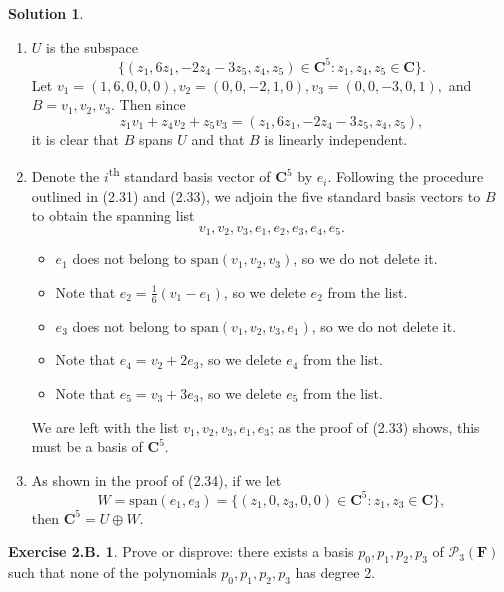 \documentclass[12pt]{article}
\theoremstyle{definition}
\theoremstyle{exercise}
\newtheorem{exercise}{Exercise 2.B.}
\theoremstyle{solution}
\newtheorem*{solution}{Solution}
\newcommand{\ts}{\textsuperscript}
\newcommand{\Span}{\text{span}}
\newcommand{\C}{\mathbf{C}}
\newcommand{\F}{\mathbf{F}}
\begin{document}
\begin{solution}
    \begin{enumerate}
        \item \( U \) is the subspace
        \[
            \{ (z_1, 6 z_1, -2 z_4 - 3 z_5, z_4, z_5) \in \C^5 : z_1, z_4, z_5 \in \C \}.
        \]
        Let \( v_1 = (1, 6, 0, 0, 0), v_2 = (0, 0, -2, 1, 0), v_3 = (0, 0, -3, 0, 1), \) and \( B = v_1, v_2, v_3 \). Then since
        \[
            z_1 v_1 + z_4 v_2 + z_5 v_3 = (z_1, 6 z_1, -2 z_4 - 3 z_5, z_4, z_5),
        \]
        it is clear that \( B \) spans \( U \) and that \( B \) is linearly independent.

        \item Denote the \( i \)\ts{th} standard basis vector of \( \C^5 \) by \( e_i \). Following the procedure outlined in (2.31) and (2.33), we adjoin the five standard basis vectors to \( B \) to obtain the spanning list
        \[
            v_1, v_2, v_3, e_1, e_2, e_3, e_4, e_5.
        \]
        \begin{itemize}
            \item \( e_1 \) does not belong to \( \Span(v_1, v_2, v_3) \), so we do not delete it.

            \item Note that \( e_2 = \tfrac{1}{6} (v_1 - e_1) \), so we delete \( e_2 \) from the list.

            \item \( e_3 \) does not belong to \( \Span(v_1, v_2, v_3, e_1) \), so we do not delete it.

            \item Note that \( e_4 = v_2 + 2 e_3 \), so we delete \( e_4 \) from the list.

            \item Note that \( e_5 = v_3 + 3 e_3 \), so we delete \( e_5 \) from the list.
        \end{itemize}
        We are left with the list \( v_1, v_2, v_3, e_1, e_3 \); as the proof of (2.33) shows, this must be a basis of \( \C^5 \).

        \item As shown in the proof of (2.34), if we let
        \[
            W = \Span (e_1, e_3) = \{ (z_1, 0, z_3, 0, 0) \in \C^5 : z_1, z_3 \in \C \},
        \]
        then \( \C^5 = U \oplus W \).
    \end{enumerate}
\end{solution}

\begin{exercise}
\label{ex:5}
    Prove or disprove: there exists a basis \( p_0, p_1, p_2, p_3 \) of \( \mathcal{P}_3 (\F) \) such that none of the polynomials \( p_0, p_1, p_2, p_3 \) has degree 2.
\end{exercise}
\end{document}
